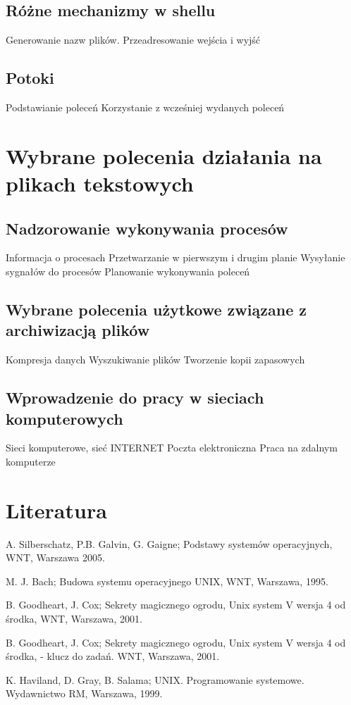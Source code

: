 \documentclass[11pt]{article}
\begin{document}
\subsection{Różne mechanizmy w shellu}
Generowanie nazw plików.
Przeadresowanie wejścia i wyjść
\subsection{Potoki}
Podstawianie poleceń
Korzystanie z wcześniej wydanych poleceń

\section{Wybrane polecenia działania na plikach tekstowych}
\subsection{Nadzorowanie wykonywania procesów}
Informacja o procesach
Przetwarzanie w pierwszym i drugim planie
Wysyłanie sygnałów do procesów
Planowanie wykonywania poleceń
\subsection{Wybrane polecenia użytkowe związane z archiwizacją plików}
Kompresja danych
Wyszukiwanie plików
Tworzenie kopii zapasowych
\subsection{Wprowadzenie do pracy w sieciach komputerowych}
Sieci komputerowe, sieć INTERNET
Poczta elektroniczna
Praca na zdalnym komputerze

\section{Literatura}

A. Silberschatz, P.B. Galvin, G. Gaigne; Podstawy systemów operacyjnych, WNT,
Warszawa 2005.

M. J. Bach; Budowa systemu operacyjnego UNIX, WNT, Warszawa, 1995.

B. Goodheart, J. Cox; Sekrety magicznego ogrodu, Unix system V wersja 4 od środka,
WNT, Warszawa, 2001.

B. Goodheart, J. Cox; Sekrety magicznego ogrodu, Unix system V wersja 4 od środka, - klucz do zadań. WNT, Warszawa, 2001.

K. Haviland, D. Gray, B. Salama; UNIX. Programowanie systemowe. Wydawnictwo RM,
Warszawa, 1999.
\end{document}
